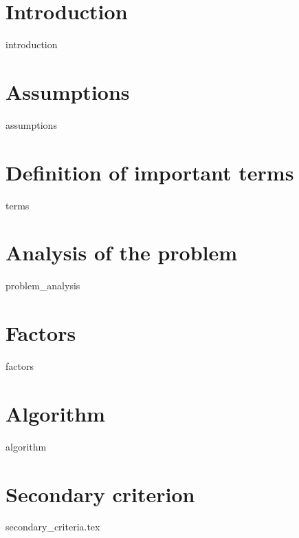 
\section{Introduction}
{introduction}

\section{Assumptions}
{assumptions}

\section{Definition of important terms}
\begin{labeling}{\hspace{3cm}}
{terms}
\end{labeling}

\section{Analysis of the problem}
{problem_analysis}

\section{Factors}
{factors}

\section{Algorithm}
{algorithm}

\section{Secondary criterion}
{secondary_criteria.tex}
